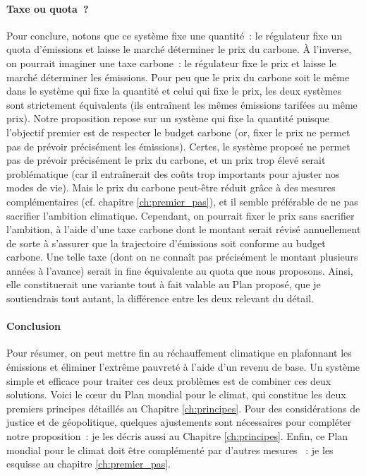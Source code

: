 \documentclass[a5paper,french,openany]{memoir}
\begin{document}
\paragraph{Taxe ou quota~?}
Pour conclure, notons que ce système fixe une quantité~: le régulateur fixe un quota d'émissions et laisse le marché déterminer le prix du carbone. À l'inverse, on pourrait imaginer une taxe carbone~: le régulateur fixe le prix et laisse le marché déterminer les émissions. Pour peu que le prix du carbone soit le même dans le système qui fixe la quantité et celui qui fixe le prix, les deux systèmes sont strictement équivalents (ils entraînent les mêmes émissions tarifées au même prix). Notre proposition repose sur un système qui fixe la quantité puisque l'objectif premier est de respecter le budget carbone (or, fixer le prix ne permet pas de prévoir précisément les émissions). Certes, le système proposé ne permet pas de prévoir précisément le prix du carbone, et un prix trop élevé serait problématique (car il entraînerait des coûts trop importants pour ajuster nos modes de vie). Mais le prix du carbone peut-être réduit grâce à des mesures complémentaires (cf. chapitre \ref{ch:premier_pas}), et il semble préférable de ne pas sacrifier l'ambition climatique. Cependant, on pourrait fixer le prix sans sacrifier l'ambition, à l'aide d'une taxe carbone dont le montant serait révisé annuellement de sorte à s'assurer que la trajectoire d'émissions soit conforme au budget carbone. Une telle taxe (dont on ne connaît pas précisément le montant plusieurs années à l'avance) serait in fine équivalente au quota que nous proposons. Ainsi, elle constituerait une variante tout à fait valable au Plan proposé, que je soutiendrais tout autant, la différence entre les deux relevant du détail. 

\paragraph{Conclusion}
Pour résumer, on peut mettre fin au réchauffement climatique en plafonnant les émissions et éliminer l'extrême pauvreté à l'aide d'un revenu de base. Un système simple et efficace pour traiter ces deux problèmes est de combiner ces deux solutions. Voici le cœur du Plan mondial pour le climat, %
qui constitue les deux premiers principes détaillés au Chapitre \ref{ch:principes}. Pour des considérations de justice et de géopolitique, quelques ajustements sont nécessaires pour compléter notre proposition~: je les décris aussi au Chapitre \ref{ch:principes}. %
Enfin, ce Plan mondial pour le climat doit être complémenté par d'autres mesures%
~: je les esquisse au chapitre \ref{ch:premier_pas}.
\end{document}
